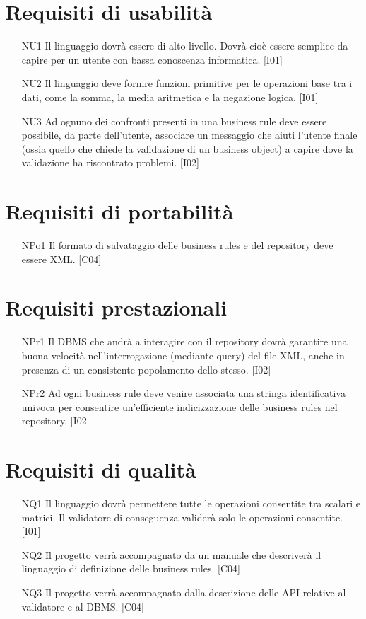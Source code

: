 \section{Requisiti di usabilit\`a}
\begin{itemize}
\item[NU1]{Il linguaggio dovr\`a essere di alto livello. Dovr\`a cio\`e essere semplice da capire per un utente con bassa conoscenza informatica. [I01]}
\item[NU2]{Il linguaggio deve fornire funzioni primitive per le operazioni base tra i dati, come la somma, la media aritmetica e la negazione logica. [I01]}
\item[NU3]{Ad ognuno dei confronti presenti in una business rule deve essere possibile, da parte dell'utente, associare un messaggio che aiuti l'utente finale (ossia quello che chiede la validazione di un business object) a capire dove la validazione ha riscontrato problemi. [I02]}
\end{itemize}

\section{Requisiti di portabilit\`a}
\begin{itemize}
\item[NPo1]{Il formato di salvataggio delle business rules e del repository deve essere XML. [C04]}
\end{itemize}
\section{Requisiti prestazionali}
\begin{itemize}
 \item[NPr1]{Il DBMS che andr\`a a interagire con il repository dovr\`a garantire una buona velocit\`a nell'interrogazione (mediante query) del file XML, anche in presenza di un consistente popolamento dello stesso. [I02]}
\item[NPr2]{Ad ogni business rule deve venire associata una stringa identificativa univoca per consentire un'efficiente indicizzazione delle business rules nel repository. [I02]}
\end{itemize}

\section{Requisiti di qualit\`a}
\begin{itemize}
\item[NQ1]{Il linguaggio dovr\`a permettere tutte le operazioni consentite tra scalari e matrici. Il validatore di conseguenza valider\`a solo le operazioni consentite. [I01]}
\item[NQ2]{Il progetto verr\`a accompagnato da un manuale che descriver\`a il linguaggio di definizione delle business rules. [C04]}
\item[NQ3]{Il progetto verr\`a accompagnato dalla descrizione delle API relative al validatore e al DBMS. [C04]}
\end{itemize}
\newpage


